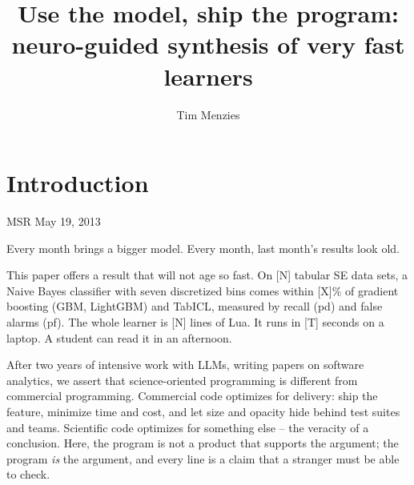 \documentclass[AMA,STIX2COL]{WileyNJD-v2}
\begin{document}
\title{Use the model, ship the program:\\
  neuro-guided synthesis of very fast learners}
\author[1]{Tim Menzies}
\address[1]{, , }



\maketitle

\section{Introduction}

MSR May 19, 2013

Every month brings a bigger model.  Every month, last month's results
look old.

This paper offers a result that will not age so fast.  On [N] tabular
SE data sets, a Naive Bayes classifier with seven discretized bins
comes within [X]\% of gradient boosting (GBM, LightGBM) and TabICL,
measured by recall (pd) and false alarms (pf).  The whole learner is
[N] lines of Lua.  It runs in [T] seconds on a laptop.  A student can
read it in an afternoon.

After two years of intensive work with LLMs, writing papers on
software analytics, we assert that science-oriented programming is
different from commercial programming.  Commercial code optimizes
for delivery: ship the feature, minimize time and cost, and let
size and opacity hide behind test suites and teams.  Scientific
code optimizes for something else -- the veracity of a conclusion.
Here, the program is not a product that supports the argument; the
program \emph{is} the argument, and every line is a claim that a
stranger must be able to check.
\end{document}
